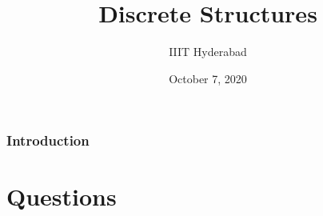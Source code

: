 \documentclass[xcolor=svgnames]{beamer}
\title[Discrete Structures]{Discrete Structures} %
\author{IIIT Hyderabad} %
\institute[] %
{
Monsoon 2020 \\ %
\medskip
\textit{Tutorial 7} %
}
\date{October 7, 2020} %
\begin{document}
\begin{frame}
\titlepage %
\end{frame}

\begin{frame}
\frametitle{Introduction} %
\tableofcontents %
\end{frame}


\section{Questions}

\end{document}
